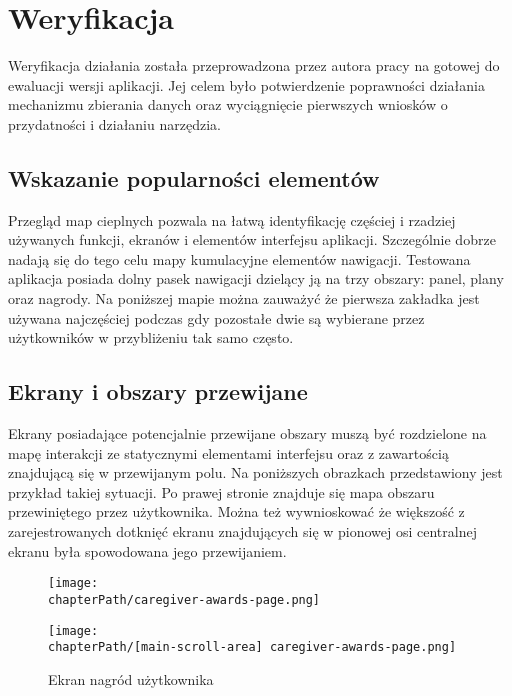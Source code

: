 \section{Weryfikacja}
Weryfikacja działania została przeprowadzona przez autora pracy na gotowej do ewaluacji wersji aplikacji. Jej celem było potwierdzenie poprawności działania mechanizmu zbierania danych oraz wyciągnięcie pierwszych wniosków o przydatności i działaniu narzędzia.

\subsection{Wskazanie popularności elementów}
Przegląd map cieplnych pozwala na łatwą identyfikację częściej i rzadziej używanych funkcji, ekranów i elementów interfejsu aplikacji. Szczególnie dobrze nadają się do tego celu mapy kumulacyjne elementów nawigacji. Testowana aplikacja posiada dolny pasek nawigacji dzielący ją na trzy obszary: panel, plany oraz nagrody. Na poniższej mapie można zauważyć że pierwsza zakładka jest używana najczęściej podczas gdy pozostałe dwie są wybierane przez użytkowników w przybliżeniu tak samo często.

\bigskip
{}

\subsection{Ekrany i obszary przewijane}
Ekrany posiadające potencjalnie przewijane obszary muszą być rozdzielone na mapę interakcji ze statycznymi elementami interfejsu oraz z zawartością znajdującą się w przewijanym polu. Na poniższych obrazkach przedstawiony jest przykład takiej sytuacji. Po prawej stronie znajduje się mapa obszaru przewiniętego przez użytkownika. Można też wywnioskować że większość z zarejestrowanych dotknięć ekranu znajdujących się w pionowej osi centralnej ekranu była spowodowana jego przewijaniem. 

\bigskip
\begin{figure}[H]
\centering
\begin{minipage}{.35\textwidth}
	\centering
	\texttt{[image: \\chapterPath/caregiver-awards-page.png]}
\end{minipage}
\begin{minipage}{.3\textwidth}
	\centering
	\texttt{[image: \\chapterPath/[main-scroll-area] caregiver-awards-page.png]}
\end{minipage}
\bigskip
\caption{Ekran nagród użytkownika}
\label{fig:rs_panel_parts}
\end{figure}

